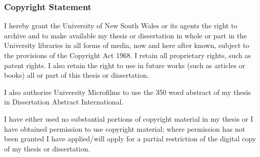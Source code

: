 \vspace{5mm}
\noindent{}


\cleardoublepage
\vspace*{1in}
\subsubsection*{Copyright Statement}

I hereby grant the University of New South Wales or its agents the right to
archive and to make available my thesis or dissertation in whole or part in the
University libraries in all forms of media, now and here after known, subject to
the provisions of the Copyright Act 1968. I retain all proprietary rights, such
as patent rights. I also retain the right to use in future works (such as
articles or books) all or part of this thesis or dissertation.

I also authorise University Microfilms to use the 350 word abstract of my thesis
in Dissertation Abstract International.

I have either used no substantial portions of copyright material in my thesis or
I have obtained permission to use copyright material; where permission has not
been granted I have applied/will apply for a partial restriction of the digital
copy of my thesis or dissertation.

\vspace{5mm}
\noindent{}


